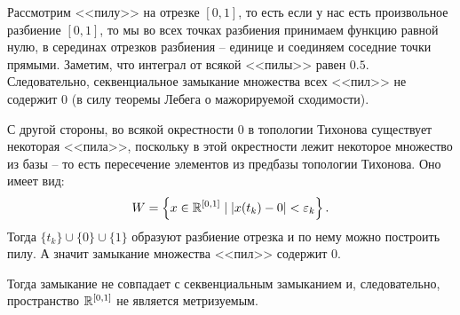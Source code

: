 \begin{example} %
    Рассмотрим <<пилу>> на отрезке $[0, 1]$, то есть если у нас есть произвольное разбиение $[0, 1]$, то мы во всех точках разбиения принимаем функцию равной нулю, в серединах отрезков разбиения -- единице и соединяем соседние точки прямыми.
    Заметим, что интеграл от всякой <<пилы>> равен $0.5$.
    Следовательно, секвенциальное замыкание множества всех <<пил>> не содержит 0 (в силу теоремы Лебега о мажорируемой сходимости).

    С другой стороны, во всякой окрестности $0$ в топологии Тихонова существует некоторая <<пила>>, поскольку в этой окрестности лежит некоторое множество из базы -- то есть пересечение элементов из предбазы топологии Тихонова.
    Оно имеет вид:
    \[
        W = \left\{x \in \mathbb{R}^{[0, 1]} \mid |x(t_k) - 0| < \varepsilon_k\right\}.
    \]
    Тогда $\{t_k\} \cup \{0\} \cup \{1\}$ образуют разбиение отрезка и по нему можно построить пилу.
    А значит замыкание множества <<пил>> содержит $0$.

    Тогда замыкание не совпадает с секвенциальным замыканием и, следовательно, пространство $\mathbb{R}^{[0, 1]}$ не является метризуемым.
\end{example}
